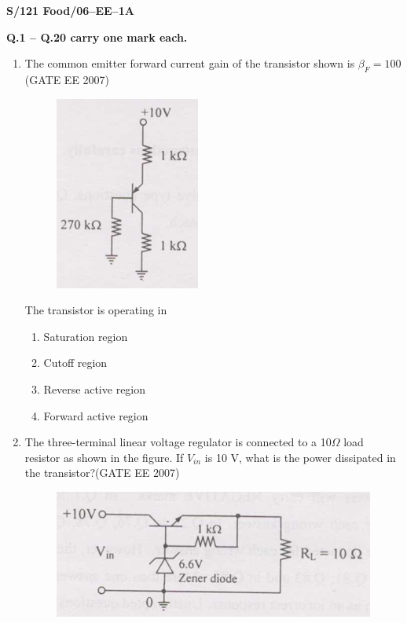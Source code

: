 \documentclass[a4paper,10pt]{exam}
\theoremstyle{remark}
\begin{document}
\vfill
\raggedright{\textbf{S/121 Food/06--EE--1A}}\\
\newpage
\begin{center}
    \textbf{Q.1 – Q.20 carry one mark each.}
\end{center}
\vspace{1em}
\begin{enumerate}
   

\item   The common emitter forward current gain of the transistor shown is $\beta_F = 100 $  \hfill{(GATE EE 2007)} 

\begin{figure}[H]
    \centering
    \includegraphics[width=0.4\linewidth]{figs/Q1.png}
\end{figure}

\raggedright{The transistor is operating in}
\begin{multicols}{2}
\begin{enumerate}
\item Saturation region
\item Cutoff region
\item Reverse active region
\item Forward active region
\end{enumerate}
\end{multicols}
\vspace{0.5cm}
\item   The three-terminal linear voltage regulator is connected to a 10\( \Omega \)
 load resistor as shown in the figure. If \( V_{in} \)
 is 10 V, what is the power dissipated in the transistor?\hfill{(GATE EE 2007)} 
\begin{figure}[H]
    \centering
    \includegraphics[width=0.5\linewidth]{figs/Q 2.png}
    

\end{figure}
\end{enumerate}
\end{document}
